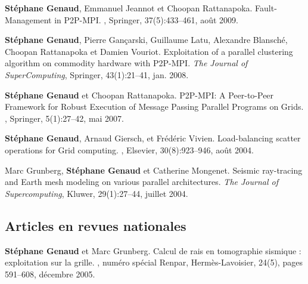 \documentclass[11pt]{article}
\begin{document}
\begin{thebibliography}{99}


\newblock \textbf{Stéphane Genaud}, Emmanuel Jeannot et Choopan Rattanapoka.
\newblock Fault-Management in P2P-MPI.
, Springer, 
37(5):433--461, août 2009.


\textbf{Stéphane Genaud}, Pierre Gançarski, Guillaume Latu, Alexandre Blansché, 
Choopan Rattanapoka et Damien Vouriot. \newblock Exploitation of a parallel 
clustering algorithm on commodity hardware with P2P-MPI.
\newblock 
{\em The Journal of SuperComputing}, Springer, 43(1):21--41, jan. 2008.


\textbf{Stéphane Genaud} et Choopan Rattanapoka.
\newblock P2P-MPI: A Peer-to-Peer Framework for Robust Execution of Message 
Passing Parallel Programs on Grids.
, Springer, 5(1):27--42, mai 2007.


\textbf{Stéphane Genaud}, Arnaud Giersch, et Frédéric Vivien.
\newblock Load-balancing scatter operations for Grid computing.
, Elsevier, 30(8):923--946, août 2004.

Marc Grunberg, \textbf{Stéphane Genaud} et Catherine Mongenet.
\newblock Seismic ray-tracing and Earth mesh modeling on various parallel
  architectures.
\newblock 
{\em The Journal of Supercomputing}, Kluwer, 29(1):27--44, juillet 2004.


\subsection*{Articles en revues nationales}
\textbf{Stéphane Genaud} et Marc Grunberg. 
\newblock  Calcul de rais en tomographie sismique : exploitation sur la grille.
, numéro spécial Renpar, 
Hermès-Lavoisier, 24(5), pages 591--608, décembre 2005.


\end{thebibliography}
\end{document}
